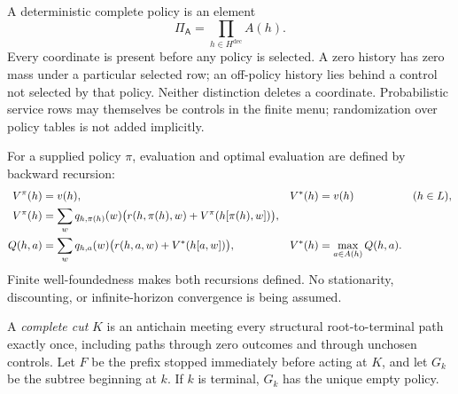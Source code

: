 \documentclass[11pt]{article}
\theoremstyle{definition}
\newcommand{\A}{\mathsf A}
\begin{document}
A deterministic complete policy is an element
\[
 \Pi_\A=\prod_{h\in H^{\mathrm{dec}}}A(h).
\]
Every coordinate is present before any policy is selected. A zero history
has zero mass under a particular selected row; an off-policy history lies
behind a control not selected by that policy. Neither distinction deletes
a coordinate. Probabilistic service rows may themselves be controls in the
finite menu; randomization over policy tables is not added implicitly.

For a supplied policy \(\pi\), evaluation and optimal evaluation are defined
by backward recursion:
\begin{align}
 V^\pi(h)&=v(h), & V^*(h)&=v(h) &&(h\in L),\notag\\
 V^\pi(h)&=\sum_w q_{h,\pi(h)}(w)
       \bigl(r(h,\pi(h),w)+V^\pi(h[\pi(h),w])\bigr), \label{eq:eval}\\
 Q(h,a)&=\sum_w q_{h,a}(w)
       \bigl(r(h,a,w)+V^*(h[a,w])\bigr),
 &V^*(h)&=\max_{a\in A(h)}Q(h,a). \label{eq:bellman}
\end{align}
Finite well-foundedness makes both recursions defined. No stationarity,
discounting, or infinite-horizon convergence is being assumed.

A \emph{complete cut} \(K\) is an antichain meeting every structural
root-to-terminal path exactly once, including paths through zero outcomes
and through unchosen controls. Let \(F\) be the prefix stopped immediately
before acting at \(K\), and let \(G_k\) be the subtree beginning at \(k\).
If \(k\) is terminal, \(G_k\) has the unique empty policy.
\end{document}
